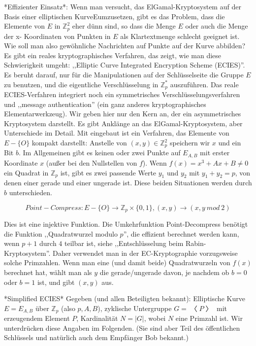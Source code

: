 \documentclass[a4paper]{article}
\begin{document}
\begin{multicols}{3}
{{{{            *Effizienter Einsatz*: Wenn man versucht, das ElGamal-Kryptosystem auf der Basis einer elliptischen KurveEumzusetzen, gibt es das Problem, dass die Elemente  von $E$ in $\mathbb{Z}^2_p$ eher dünn sind, so dass die Menge $E$ oder auch die Menge der x-
            Koordinaten von Punkten in $E$ als Klartextmenge schlecht geeignet ist. Wie soll man also gewöhnliche Nachrichten auf Punkte auf der Kurve abbilden? Es gibt ein reales kryptographisches Verfahren, das zeigt, wie man diese Schwierigkeit umgeht: ,,Elliptic Curve Integrated Encryption Scheme (ECIES)''. Es beruht darauf, nur für die Manipulationen auf der Schlüsselseite die Gruppe $E$ zu benutzen, und die eigentliche Verschlüsselung in $\mathbb{Z}^*_p$ auszuführen. Das reale ECIES-Verfahren integriert noch ein symmetrisches Verschlüsselungsverfahren und ,,message authentication'' (ein ganz anderes kryptographisches Elementarwerkzeug). Wir geben hier nur den Kern an, der ein asymmetrisches Kryptosystem darstellt. Es gibt Anklänge an das ElGamal-Kryptosystem, aber Unterschiede im Detail.
            Mit eingebaut ist ein Verfahren, das Elemente von $E-\{O\}$ kompakt darstellt: Anstelle von $(x,y)\in\mathbb{Z}^2_p$ speichern wir $x$ und ein Bit $b$. Im Allgemeinen gibt es keinen oder zwei Punkte auf $E_{A,B}$ mit erster Koordinate $x$ (außer bei den Nullstellen von $f$). Wenn $f(x)=x^3+Ax+B\not= 0$ ein Quadrat in $\mathbb{Z}_p$ ist, gibt es zwei passende Werte $y_1$ und $y_2$ mit $y_1+y_2=p$, von denen einer gerade und einer ungerade ist. Diese beiden Situationen werden durch $b$ unterschieden.

            $$Point-Compress: E-\{O\}\rightarrow\mathbb{Z}_p \times\{0,1\},(x,y)\rightarrow (x,y\ mod\ 2)$$

            Dies ist eine injektive Funktion. Die Umkehrfunktion Point-Decompress benötigt die Funktion ,,Quadratwurzel modulo $p$'', die effizient berechnet werden kann, wenn $p+1$ durch $4$ teilbar ist, siehe ,,Entschlüsselung beim Rabin-Kryptosystem''. Daher verwendet man in der EC-Kryptographie vorzugsweise solche Primzahlen. Wenn man eine (und damit beide) Quadratwurzeln von $f(x)$ berechnet hat, wählt man als $y$ die gerade/ungerade davon, je nachdem ob $b=0$ oder $b=1$ ist, und gibt $(x,y)$ aus.

            *Simplified ECIES*
            Gegeben (und allen Beteiligten bekannt): Elliptische Kurve $E=E_{A,B}$ über $\mathbb{Z}_p$ (also $p,A,B$), zyklische Untergruppe $G=〈P〉$ mit erzeugendem Element $P$, Kardinalität $N=|G|$, wobei $N$ eine Primzahl ist. Wir unterdrücken diese Angaben im Folgenden.
            (Sie sind aber Teil des öffentlichen Schlüssels und natürlich auch dem Empfänger Bob bekannt.)

}}}}
\end{multicols}
\end{document}
